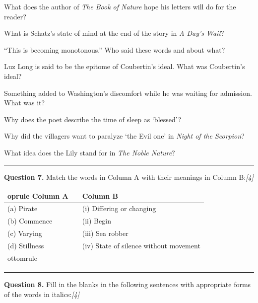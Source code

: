 \documentclass[11pt,a4paper]{article}
\newcommand{\pts}[1]{\hfill   \textit{[#1]}}
\begin{document}
\begin{parts}
  \item What does the author of   \textit{The Book of Nature} hope his letters will do for the reader?
  \item What is Schatz's state of mind at the end of the story in   \textit{A Day's Wait}?
  \item ``This is becoming monotonous.'' Who said these words and about what?
  \item Luz Long is said to be the epitome of Coubertin's ideal. What was Coubertin's ideal?
  \item Something added to Washington's discomfort while he was waiting for admission. What was it?
  \item Why does the poet describe the time of sleep as `blessed'?
  \item Why did the villagers want to paralyze `the Evil one' in   \textit{Night of the Scorpion}?
  \item What idea does the Lily stand for in   \textit{The Noble Nature}?
\end{parts}

\medskip\rule{\linewidth}{0.2pt}


\newpage




\noindent   \textbf{Question 7.}
Match the words in Column A with their meanings in Column B:\pts{4}


\begin{center}

\begin{tabular}{lll}
 oprule
   \textbf{Column A} & &   \textbf{Column B} \\
\midrule
(a) Pirate & & (i) Differing or changing \\
(b) Commence & & (ii) Begin \\
(c) Varying & & (iii) Sea robber \\
(d) Stillness & & (iv) State of silence without movement \\
ottomrule
\end{tabular}
\end{center}

\medskip\rule{\linewidth}{0.2pt}




\noindent   \textbf{Question 8.}
Fill in the blanks in the following sentences with appropriate forms of the words in italics:\pts{4}
\end{document}
